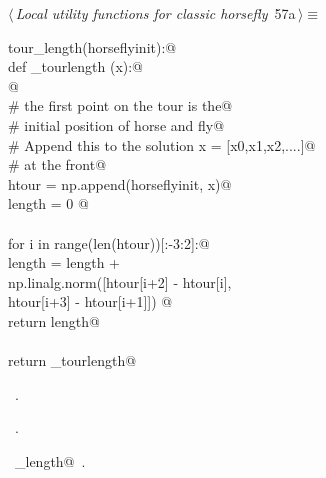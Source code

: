 \documentclass[11.5pt]{report}
\begin{document}
\begin{flushleft} \small\label{scrap82}\raggedright\small
{} $\langle\,${\itshape Local utility functions for classic horsefly}\nobreak\ {\footnotesize {57a}}$\,\rangle\equiv$
\vspace{-1ex}
\begin{list}{}{} \item
\mbox{}\verb@def tour_length(horseflyinit):@\\
\mbox{}\verb@   def _tourlength (x):@\\
\mbox{}\verb@         @\\
\mbox{}\verb@        # the first point on the tour is the@\\
\mbox{}\verb@        # initial position of horse and fly@\\
\mbox{}\verb@        # Append this to the solution x = [x0,x1,x2,....]@\\
\mbox{}\verb@        # at the front@\\
\mbox{}\verb@        htour = np.append(horseflyinit, x)@\\
\mbox{}\verb@        length = 0 @\\
\mbox{}\verb@@\\
\mbox{}\verb@        for i in range(len(htour))[:-3:2]:@\\
\mbox{}\verb@                length = length + \@\\
\mbox{}\verb@                         np.linalg.norm([htour[i+2] - htour[i], \@\\
\mbox{}\verb@                                         htour[i+3] - htour[i+1]]) @\\
\mbox{}\verb@        return length@\\
\mbox{}\verb@@\\
\mbox{}\verb@   return _tourlength@\\
\mbox{}\verb@@{\NWsep}
\end{list}
\vspace{-1.5ex}
\footnotesize
\begin{list}{}{\setlength{\itemsep}{-\parsep}\setlength{\itemindent}{-\leftmargin}}
\item \NWtxtMacroDefBy\ .
\item \NWtxtMacroRefIn\ .
\item \NWtxtIdentsDefed\nobreak\  \verb@tour_length@\nobreak\ .
\item{}
\end{list}
\vspace{4ex}
\end{flushleft}
\end{document}
